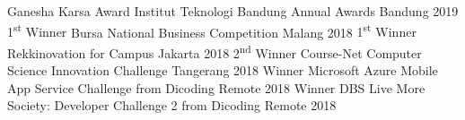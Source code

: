 



\begin{cvhonors}

  \cvhonor
    {Ganesha Karsa Award} %
    {Institut Teknologi Bandung Annual Awards} %
    {Bandung} %
    {2019} %
  \cvhonor
    {1\textsuperscript{st} Winner} %
    {Bursa National Business Competition} %
    {Malang} %
    {2018} %
  \cvhonor
    {1\textsuperscript{st} Winner} %
    {Rekkinovation for Campus} %
    {Jakarta} %
    {2018} %
  \cvhonor
    {2\textsuperscript{nd} Winner} %
    {Course-Net Computer Science Innovation Challenge } %
    {Tangerang} %
    {2018} %
  \cvhonor
    {Winner} %
    {Microsoft Azure Mobile App Service Challenge from Dicoding} %
    {Remote} %
    {2018} %
  \cvhonor
    {Winner} %
    {DBS Live More Society: Developer Challenge 2 from Dicoding} %
    {Remote} %
    {2018} %

\end{cvhonors}




